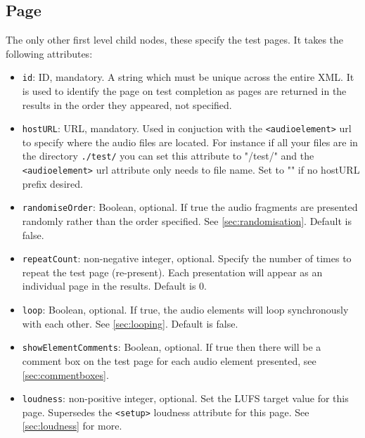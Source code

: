 \documentclass[11pt, oneside]{article}   	%
\begin{document}
    \subsection{Page}
    \label{sec:page}
        The only other first level child nodes, these specify the test pages. It takes the following attributes:
        \begin{itemize}
            \item \texttt{id}: ID, mandatory. A string which must be unique across the entire XML. It is used to identify the page on test completion as pages are returned in the results in the order they appeared, not specified.
            \item \texttt{hostURL}: URL, mandatory. Used in conjuction with the \texttt{<audioelement>} url to specify where the audio files are located. For instance if all your files are in the directory \texttt{./test/} you can set this attribute to "/test/" and the \texttt{<audioelement>} url attribute only needs to file name. Set to "" if no hostURL prefix desired.
            \item \texttt{randomiseOrder}: Boolean, optional. If true the audio fragments are presented randomly rather than the order specified. See \ref{sec:randomisation}. Default is false.
            \item \texttt{repeatCount}: non-negative integer, optional. Specify the number of times to repeat the test page (re-present). Each presentation will appear as an individual page in the results. Default is 0.
            \item \texttt{loop}: Boolean, optional. If true, the audio elements will loop synchronously with each other. See \ref{sec:looping}. Default is false.
            \item \texttt{showElementComments}: Boolean, optional. If true then there will be a comment box on the test page for each audio element presented, see \ref{sec:commentboxes}.
            \item \texttt{loudness}: non-positive integer, optional. Set the LUFS target value for this page. Supersedes the \texttt{<setup>} loudness attribute for this page. See \ref{sec:loudness} for more.
        \end{itemize}
        
\end{document}
